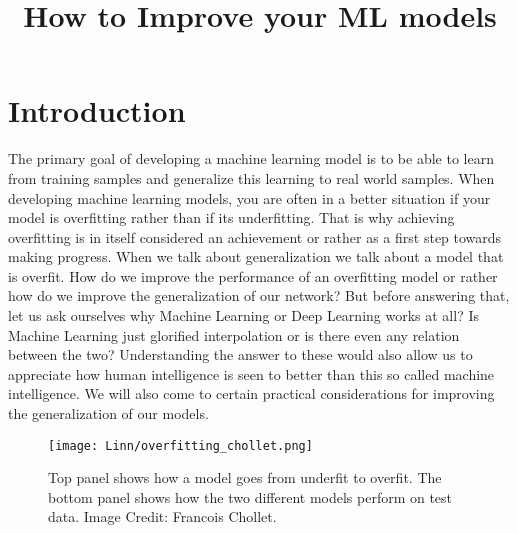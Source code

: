 \documentclass{../template/texnote}
\title{\textbf{How to Improve your ML models}}[author={Linn Abraham}]
\begin{document}
    \maketitle {}
\section{Introduction}
The primary goal of developing a machine learning model is to be able to learn from training samples and 
generalize this learning to real world samples.
When developing machine learning models, you are often in a better situation if your model is overfitting rather than if its underfitting.
That is why achieving overfitting is in itself considered an achievement or rather as a first step towards making progress.
When we talk about generalization we talk about a model that is overfit.
How do we improve the performance of an overfitting model or rather how do we improve the generalization of our network?
But before answering that, let us ask ourselves why Machine Learning or Deep Learning works at all?
Is Machine Learning just glorified interpolation or is there even any relation between the two?
Understanding the answer to these would also allow us to appreciate how human intelligence is seen to 
better than this so called machine intelligence.
We will also come to certain practical considerations for improving the generalization of our models.
    \begin{figure}
    \begin{center}
        \texttt{[image: Linn/overfitting\_chollet.png]}
    \end{center}
    \caption{Top panel shows how a model goes from underfit to overfit. The bottom panel shows how the two different models perform on test data. Image Credit: Francois Chollet.}
    \label{fig:overfit}
    \end{figure}
    
\end{document}

